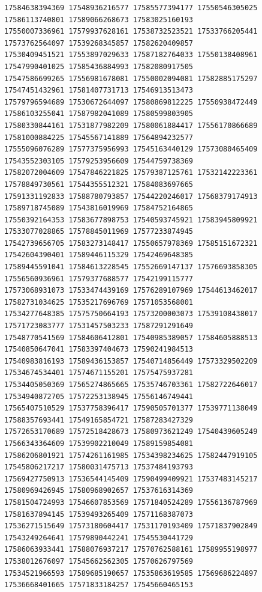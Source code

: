 \documentclass[10pt]{article}
\begin{document}
\begin{verbatim}
17584638394369 17548936216577 17585577394177 17550546305025 17586113740801 17589066268673 17583025160193
17550007336961 17579937628161 17538732523521 17533766205441 17573762564097 17539268345857 17582620409857
17530409451521 17553897029633 17587182764033 17550138408961 17547990401025 17585436884993 17582080917505
17547586699265 17556981678081 17550002094081 17582885175297 17547451432961 17581407731713 17546913513473
17579796594689 17530672644097 17580869812225 17550938472449 17586103255041 17587982041089 17580599803905
17580330844161 17531877982209 17580061884417 17556170866689 17581000884225 17545567141889 17564894232577
17555096076289 17577375956993 17545163440129 17573080465409 17543552303105 17579253956609 17544759738369
17582072004609 17547846221825 17579387125761 17532142223361 17578849730561 17544355512321 17584083697665
17591331192833 17588780793857 17544220246017 17568379174913 17589718745089 17543816019969 17584752164865
17550392164353 17583677898753 17540593745921 17583945809921 17533077028865 17578845011969 17577233874945
17542739656705 17583273148417 17550657978369 17585151672321 17542604390401 17589446115329 17542469648385
17589445591041 17584613228545 17552669147137 17576693858305 17556560936961 17579377688577 17542199115777
17573068931073 17533474439169 17576289107969 17544613462017 17582731034625 17535217696769 17571053568001
17534277648385 17575750664193 17573200003073 17539108438017 17571723083777 17531457503233 17587291291649
17548770541569 17584606412801 17540985389057 17584605888513 17540850647041 17583397404673 17590241984513
17540983816193 17589436153857 17540714856449 17573329502209 17534674534401 17574671155201 17575475937281
17534405050369 17565274865665 17535746703361 17582722646017 17534940872705 17572253138945 17556146749441
17565407510529 17537758396417 17590505701377 17539771138049 17588357693441 17549165854721 17587283427329
17572653170689 17572518428673 17580973621249 17540439605249 17566343364609 17539902210049 17589159854081
17586206801921 17574261161985 17534398234625 17582447919105 17545806217217 17580031475713 17537484193793
17569427750913 17536544145409 17590499409921 17537483145217 17580969426945 17580968902657 17537616314369
17581504724993 17546607853569 17571840524289 17556136787969 17581637894145 17539493265409 17571168387073
17536271515649 17573180604417 17531170193409 17571837902849 17543249264641 17579890442241 17545530441729
17586063933441 17588076937217 17570762588161 17589955198977 17538012676097 17545662562305 17570626797569
17534521966593 17589685190657 17535863619585 17569686224897 17536668401665 17571833184257 17545660465153

\end{verbatim}
\end{document}
